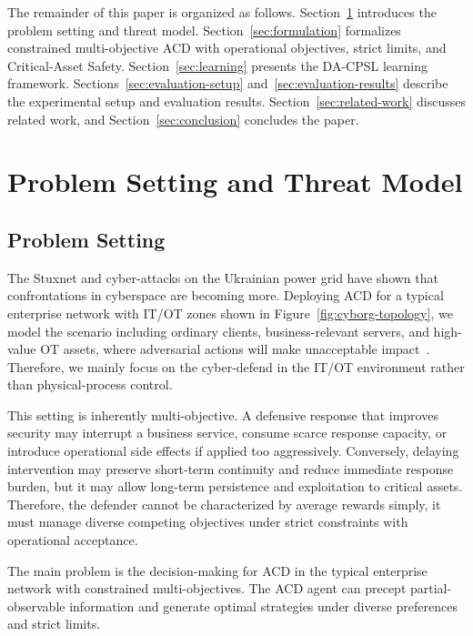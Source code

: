 \documentclass[sigconf,review,anonymous]{acmart}
\begin{document}
The remainder of this paper is organized as follows.
Section~\ref{sec:problem-threat} introduces the problem setting and threat model.
Section~\ref{sec:formulation} formalizes constrained multi-objective ACD with operational objectives, strict limits, and Critical-Asset Safety.
Section~\ref{sec:learning} presents the DA-CPSL learning framework.
Sections~\ref{sec:evaluation-setup} and~\ref{sec:evaluation-results} describe the experimental setup and evaluation results.
Section~\ref{sec:related-work} discusses related work, and Section~\ref{sec:conclusion} concludes the paper.



\section{Problem Setting and Threat Model}
\label{sec:problem-threat}

\subsection{Problem Setting}
\label{subsec:operational-setting}

The Stuxnet and cyber-attacks on the Ukrainian power grid have shown that confrontations in cyberspace are becoming more.
Deploying ACD for a typical enterprise network with IT/OT zones shown in Figure~\ref{fig:cyborg-topology}, we model the scenario including ordinary clients, business-relevant servers, and high-value OT assets, where adversarial actions will make unacceptable impact~\cite{nist_sp80082r3}. 
Therefore, we mainly focus on the cyber-defend in the IT/OT environment rather than physical-process control.

This setting is inherently multi-objective. A defensive response that improves security may interrupt a business service, consume scarce response capacity, or introduce operational side effects if applied too aggressively.
Conversely, delaying intervention may preserve short-term continuity and reduce immediate response burden, but it may allow long-term persistence and exploitation to critical assets.
Therefore, the defender cannot be characterized by average rewards simply, it must manage diverse competing objectives under strict constraints with operational acceptance.

The main problem is the decision-making for ACD in the typical enterprise network with constrained multi-objectives. 
The ACD agent can precept partial-observable information and generate optimal strategies under diverse preferences and strict limits. 
\end{document}
